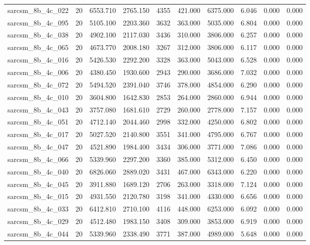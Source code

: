 \begin{tabular}{lrrrrrrrrr}
sarcsm\_8b\_4c\_022 & 20 & 6553.710 & 2765.150 & 4355 & 421.000 & 6375.000 & 6.046 & 0.000 & 0.000 \\
sarcsm\_8b\_4c\_095 & 20 & 5105.100 & 2203.360 & 3632 & 363.000 & 5035.000 & 6.804 & 0.000 & 0.000 \\
sarcsm\_8b\_4c\_038 & 20 & 4902.100 & 2117.030 & 3436 & 310.000 & 3806.000 & 6.257 & 0.000 & 0.000 \\
sarcsm\_8b\_4c\_065 & 20 & 4673.770 & 2008.180 & 3267 & 312.000 & 3806.000 & 6.117 & 0.000 & 0.000 \\
sarcsm\_8b\_4c\_016 & 20 & 5426.530 & 2292.200 & 3328 & 363.000 & 5043.000 & 6.528 & 0.000 & 0.000 \\
sarcsm\_8b\_4c\_006 & 20 & 4380.450 & 1930.600 & 2943 & 290.000 & 3686.000 & 7.032 & 0.000 & 0.000 \\
sarcsm\_8b\_4c\_072 & 20 & 5494.520 & 2391.040 & 3746 & 378.000 & 4854.000 & 6.290 & 0.000 & 0.000 \\
sarcsm\_8b\_4c\_010 & 20 & 3604.800 & 1642.830 & 2853 & 264.000 & 2860.000 & 6.944 & 0.000 & 0.000 \\
sarcsm\_8b\_4c\_043 & 20 & 3757.080 & 1681.610 & 2729 & 260.000 & 2778.000 & 7.157 & 0.000 & 0.000 \\
sarcsm\_8b\_4c\_051 & 20 & 4712.140 & 2044.460 & 2998 & 332.000 & 4250.000 & 6.802 & 0.000 & 0.000 \\
sarcsm\_8b\_4c\_017 & 20 & 5027.520 & 2140.800 & 3551 & 341.000 & 4795.000 & 6.767 & 0.000 & 0.000 \\
sarcsm\_8b\_4c\_047 & 20 & 4521.890 & 1984.400 & 3434 & 306.000 & 3771.000 & 7.086 & 0.000 & 0.000 \\
sarcsm\_8b\_4c\_066 & 20 & 5339.960 & 2297.200 & 3360 & 385.000 & 5312.000 & 6.450 & 0.000 & 0.000 \\
sarcsm\_8b\_4c\_040 & 20 & 6826.060 & 2889.020 & 3431 & 467.000 & 6343.000 & 6.220 & 0.000 & 0.000 \\
sarcsm\_8b\_4c\_045 & 20 & 3911.880 & 1689.120 & 2706 & 263.000 & 3318.000 & 7.124 & 0.000 & 0.000 \\
sarcsm\_8b\_4c\_015 & 20 & 4931.550 & 2120.780 & 3198 & 341.000 & 4330.000 & 6.656 & 0.000 & 0.000 \\
sarcsm\_8b\_4c\_033 & 20 & 6412.810 & 2710.100 & 4116 & 448.000 & 6253.000 & 6.092 & 0.000 & 0.000 \\
sarcsm\_8b\_4c\_029 & 20 & 4512.480 & 1983.150 & 3408 & 309.000 & 3853.000 & 6.919 & 0.000 & 0.000 \\
sarcsm\_8b\_4c\_044 & 20 & 5339.960 & 2338.490 & 3771 & 387.000 & 4989.000 & 5.648 & 0.000 & 0.000 \\

\end{tabular}
